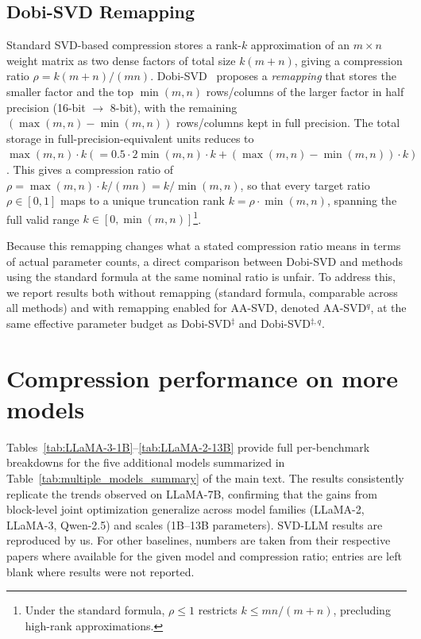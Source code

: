 \documentclass[10pt]{article} %
\theoremstyle{definition}
\theoremstyle{remark}
\newcommand{\ourmethodlight}{{\textsc{AA-SVD}}}
\begin{document}
\subsection{Dobi-SVD Remapping}
\label{sec:appendix_dobi_svd_remapping}

Standard SVD-based compression stores a rank-$k$ approximation of an $m \times n$ weight matrix as two dense factors of total size $k(m+n)$, giving a compression ratio $\rho = k(m+n)/(mn)$.
Dobi-SVD~\citep{Wang2025DobiSVD} proposes a \emph{remapping} that stores the smaller factor and the top $\min(m,n)$ rows/columns of the larger factor in half precision (16-bit $\to$ 8-bit), with the remaining $(\max(m,n) - \min(m,n))$ rows/columns kept in full precision.
The total storage in full-precision-equivalent units reduces to $\max(m,n) \cdot k (=0.5 \cdot 2\min(m,n) \cdot k + (\max(m,n) - \min(m,n)) \cdot k)$.
This gives a compression ratio of $\rho = \max(m,n) \cdot k / (mn) = k / \min(m,n)$, so that every target ratio $\rho \in [0, 1]$ maps to a unique truncation rank $k = \rho \cdot \min(m,n)$, spanning the full valid range $k \in [0, \min(m,n)]$\footnote{Under the standard formula, $\rho \leq 1$ restricts $k \leq mn/(m+n)$, precluding high-rank approximations.}.

Because this remapping changes what a stated compression ratio means in terms of actual parameter counts, a direct comparison between Dobi-SVD and methods using the standard formula at the same nominal ratio is unfair.
To address this, we report results both without remapping (standard formula, comparable across all methods) and with remapping enabled for \ourmethodlight, denoted \ourmethodlight$^q$, at the same effective parameter budget as Dobi-SVD$^{\ddagger}$ and Dobi-SVD$^{\ddagger, q}$.

\section{Compression performance on more models}
\label{sec:comparison_more_models}

Tables~\ref{tab:LLaMA-3-1B}--\ref{tab:LLaMA-2-13B} provide full per-benchmark breakdowns for the five additional models summarized in Table~\ref{tab:multiple_models_summary} of the main text.
The results consistently replicate the trends observed on LLaMA-7B, confirming that the gains from block-level joint optimization generalize across model families (LLaMA-2, LLaMA-3, Qwen-2.5) and scales (1B--13B parameters).
SVD-LLM results are reproduced by us.
For other baselines, numbers are taken from their respective papers where available for the given model and compression ratio; entries are left blank where results were not reported.
\end{document}
